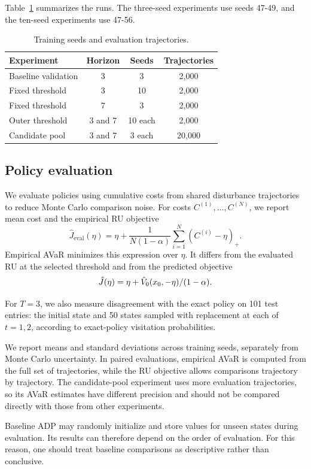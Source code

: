 Table~\ref{tab:exp-runs} summarizes the runs. The three-seed experiments use seeds 47-49, and the ten-seed experiments use 47-56.

\begin{table}[H]
	\centering
	\caption{Training seeds and evaluation trajectories.}
	\begin{tabular}{lccc}
		\hline
		Experiment & Horizon & Seeds & Trajectories \\
		\hline
		Baseline validation & 3 & 3 & 2,000 \\
		Fixed threshold & 3 & 10 & 2,000 \\
		Fixed threshold & 7 & 3 & 2,000 \\
		Outer threshold & 3 and 7 & 10 each & 2,000 \\
		Candidate pool & 3 and 7 & 3 each & 20,000 \\
		\hline
	\end{tabular}
	\label{tab:exp-runs}
\end{table}

\subsection{Policy evaluation}
\label{exp:evaluation}

We evaluate policies using cumulative costs from shared disturbance trajectories to reduce Monte Carlo comparison noise. For costs $C^{(1)},\dots,C^{(N)}$, we report mean cost and the empirical RU objective
\begin{equation}
	\hat{J}_{\text{eval}}(\eta)
	=
	\eta+\frac{1}{N(1-\alpha)}
	\sum_{i=1}^{N}(C^{(i)}-\eta)_+.
	\label{eval-ru}
\end{equation}
Empirical AVaR minimizes this expression over $\eta$. It differs from the evaluated RU at the selected threshold and from the predicted objective
\begin{equation}
	\hat{J}(\eta)=\eta+\hat{V}_0(x_0,-\eta)/(1-\alpha).
	\notag
	\label{predicted-objective}
\end{equation}

For $T=3$, we also measure disagreement with the exact
policy on 101 test entries: the initial state and 50 states
sampled with replacement at each of $t=1,2$, according
to exact-policy visitation probabilities.

We report means and standard deviations across training
seeds, separately from Monte Carlo uncertainty. In paired evaluations, empirical AVaR is computed from the full set of trajectories, while the RU objective allows comparisons trajectory by trajectory. The candidate-pool experiment uses more evaluation trajectories, so its AVaR estimates have different precision and should not be compared directly with those from other experiments.

Baseline ADP may randomly initialize and store values for unseen states during evaluation. Its results can therefore depend on the order of evaluation. For this reason, one should treat baseline comparisons as descriptive rather than conclusive.
